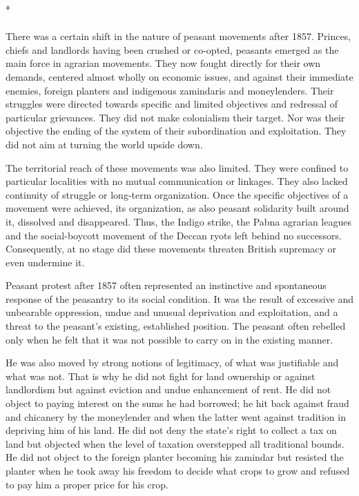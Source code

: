 \begin{multicols}{2}
\begin{center}*\end{center}

\paragraph*{}
There was a certain shift in the nature of peasant movements after 1857. Princes, chiefs and landlords having been crushed or co-opted, peasants emerged as the main force in agrarian movements. They now fought directly for their own demands, centered almost wholly on economic issues, and against their immediate enemies, foreign planters and indigenous zamindaris and moneylenders. Their struggles were directed towards specific and limited objectives and redressal of particular grievances. They did not make colonialism their target. Nor was their objective the ending of the system of their subordination and exploitation. They did not aim at turning the world upside down.

The territorial reach of these movements was also limited. They were confined to particular localities with no mutual communication or linkages. They also lacked continuity of struggle or long-term organization. Once the specific objectives of a movement were achieved, its organization, as also peasant solidarity built around it, dissolved and disappeared. Thus, the Indigo strike, the Pabna agrarian leagues and the social-boycott movement of the Deccan ryots left behind no successors. Consequently, at no stage did these movements threaten British supremacy or even undermine it.

Peasant protest after 1857 often represented an instinctive and spontaneous response of the peasantry to its social condition. It was the result of excessive and unbearable oppression, undue and unusual deprivation and exploitation, and a threat to the peasant's existing, established position. The peasant often rebelled only when he felt that it was not possible to carry on in the existing manner.

He was also moved by strong notions of legitimacy, of what was justifiable and what was not. That is why he did not fight for land ownership or against landlordism but against eviction and undue enhancement of rent. He did not object to paying interest on the sums he had borrowed; he hit back against fraud and chicanery by the moneylender and when the latter went against tradition in depriving him of his land. He did not deny the state's right to collect a tax on land but objected when the level of taxation overstepped all traditional bounds. He did not object to the foreign planter becoming his zamindar but resisted the planter when he took away his freedom to decide what crops to grow and refused to pay him a proper price for his crop.


\end{multicols}
